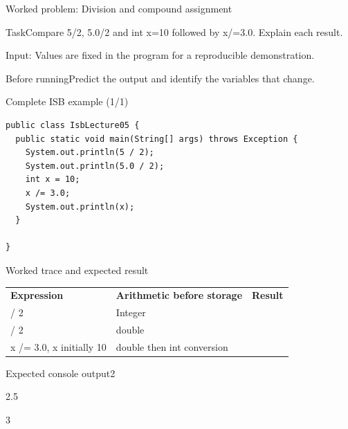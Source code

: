 \documentclass[10pt,aspectratio=169]{beamer}
\begin{document}
\begin{frame}[fragile,t]{Worked problem: Division and compound assignment}
\begin{block}{Task}Compare 5/2, 5.0/2 and int x=10 followed by x/=3.0. Explain each result.\end{block}
\small Input: Values are fixed in the program for a reproducible demonstration.\par\vspace{3mm}\begin{exampleblock}{Before running}Predict the output and identify the variables that change.\end{exampleblock}
\end{frame}

\begin{frame}[fragile,t]{Complete ISB example (1/1)}
\begin{lstlisting}
public class IsbLecture05 {
  public static void main(String[] args) throws Exception {
    System.out.println(5 / 2);
    System.out.println(5.0 / 2);
    int x = 10;
    x /= 3.0;
    System.out.println(x);
  }

}
\end{lstlisting}
\end{frame}

\begin{frame}[fragile,t]{Worked trace and expected result}
\small\renewcommand{\arraystretch}{1.4}
\begin{tabularx}{\textwidth}{>{\raggedright\arraybackslash}X>{\raggedright\arraybackslash}X>{\raggedright\arraybackslash}X}\rowcolor{navy}
\color{white}\bfseries Expression & \color{white}\bfseries Arithmetic before storage & \color{white}\bfseries Result\\
5 / 2 & Integer & 2\\
5.0 / 2 & double & 2.5\\
x /= 3.0, x initially 10 & double then int conversion & 3\\
\end{tabularx}\par\vspace{2mm}
\begin{block}{Expected console output}\ttfamily\footnotesize 2\par 2.5\par 3\end{block}
\end{frame}
\end{document}
